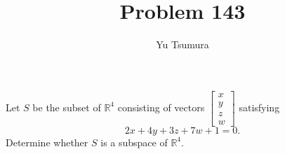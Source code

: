 \documentclass{ximera}
\title{Problem 143}
\author{Yu Tsumura}
\begin{document}
\begin{problem}
  Let $S$ be the subset of $\mathbb{R}^4$ consisting of vectors $\begin{bmatrix}
    x \\
    y \\
    z \\
    w 
  \end{bmatrix}$ satisfying
  \[2x+4y+3z+7w+1=0.\]
  Determine whether $S$ is a subspace of $\mathbb{R}^4$.

  \begin{multipleChoice}
  \end{multipleChoice}

\end{problem}
\end{document}
